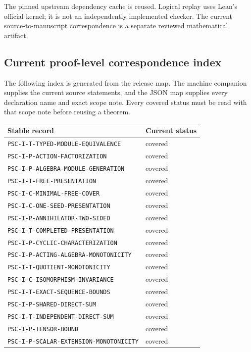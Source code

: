The pinned upstream dependency cache is reused. Logical replay uses Lean's official kernel; it is not an independently implemented checker. The current source-to-manuscript correspondence is a separate reviewed mathematical artifact.


\subsection{Current proof-level correspondence index}
The following index is generated from the release map. The machine companion supplies the current source statements, and the JSON map supplies every declaration name and exact scope note. Every covered status must be read with that scope note before reusing a theorem.

{\small
\begin{longtable}{p{}p{}}
\toprule Stable record & Current status \\\midrule\endhead
\nolinkurl{PSC-I-T-TYPED-MODULE-EQUIVALENCE} & covered \\
\nolinkurl{PSC-I-P-ACTION-FACTORIZATION} & covered \\
\nolinkurl{PSC-I-P-ALGEBRA-MODULE-GENERATION} & covered \\
\nolinkurl{PSC-I-T-FREE-PRESENTATION} & covered \\
\nolinkurl{PSC-I-C-MINIMAL-FREE-COVER} & covered \\
\nolinkurl{PSC-I-C-ONE-SEED-PRESENTATION} & covered \\
\nolinkurl{PSC-I-P-ANNIHILATOR-TWO-SIDED} & covered \\
\nolinkurl{PSC-I-T-COMPLETED-PRESENTATION} & covered \\
\nolinkurl{PSC-I-P-CYCLIC-CHARACTERIZATION} & covered \\
\nolinkurl{PSC-I-P-ACTING-ALGEBRA-MONOTONICITY} & covered \\
\nolinkurl{PSC-I-T-QUOTIENT-MONOTONICITY} & covered \\
\nolinkurl{PSC-I-C-ISOMORPHISM-INVARIANCE} & covered \\
\nolinkurl{PSC-I-T-EXACT-SEQUENCE-BOUNDS} & covered \\
\nolinkurl{PSC-I-P-SHARED-DIRECT-SUM} & covered \\
\nolinkurl{PSC-I-T-INDEPENDENT-DIRECT-SUM} & covered \\
\nolinkurl{PSC-I-P-TENSOR-BOUND} & covered \\
\nolinkurl{PSC-I-P-SCALAR-EXTENSION-MONOTONICITY} & covered \\

\end{longtable}}
